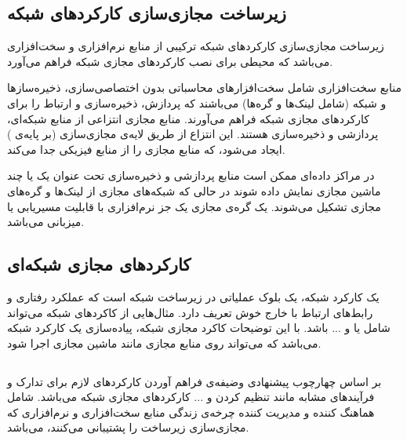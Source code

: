 \subsection{زیرساخت مجازی‌سازی کارکردهای شبکه}
زیرساخت مجازی‌سازی کارکردهای شبکه ترکیبی از منابع نرم‌افزاری و سخت‌افزاری می‌باشد
که محیطی برای نصب
کارکردهای مجازی شبکه فراهم می‌آورد.

منابع سخت‌افزاری شامل سخت‌افزارهای محاسباتی بدون اختصاصی‌سازی،
ذخیره‌سازها و شبکه
(شامل لینک‌ها و گره‌ها)
می‌باشند
که پردازش، ذخیره‌سازی و ارتباط را
برای کارکردهای مجازی شبکه فراهم می‌آورند.
منابع مجازی انتزاعی از منابع شبکه‌ای، پردازشی و ذخیر‌ه‌سازی هستند.
این انتزاع از طریق لایه‌ی مجازی‌سازی (بر پایه‌ی ) ایجاد می‌شود،
که منابع مجازی را از منابع فیزیکی جدا می‌کند.

در مراکز داده‌ای ممکن است منابع پردازشی و ذخیره‌سازی تحت عنوان یک یا چند
ماشین مجازی نمایش داده شوند در حالی که شبکه‌های مجازی از لینک‌ها و گره‌های مجازی تشکیل می‌شوند.
یک گره‌ی مجازی یک جز نرم‌افزاری با قابلیت مسیریابی یا میزبانی می‌باشد.

\subsection{کارکردهای مجازی شبکه‌ای}
یک کارکرد شبکه، یک بلوک عملیاتی در زیرساخت شبکه است که عملکرد رفتاری و رابط‌های ارتباط با خارج خوش تعریف دارد.
مثال‌هایی از کاکردهای شبکه می‌تواند شامل
یا
و ... باشد.
با این توضیحات کاکرد مجازی شبکه، پیاده‌سازی یک کارکرد شبکه می‌باشد
که می‌تواند روی منابع مجازی مانند ماشین مجازی اجرا شود.

\subsection{}
بر اساس چهارچوب پیشنهادی 
وضیفه‌ی  فراهم آوردن کارکردهای لازم
برای تدارک و فرآیند‌های مشابه مانند تنظیم کردن و ... کارکردهای مجازی شبکه می‌باشد.
 شامل هماهنگ کننده و مدیریت کننده چرخه‌ی زندگی
منابع سخت‌افزاری و نرم‌افزاری که مجازی‌سازی زیرساخت را پشتیبانی می‌کنند، می‌باشد.